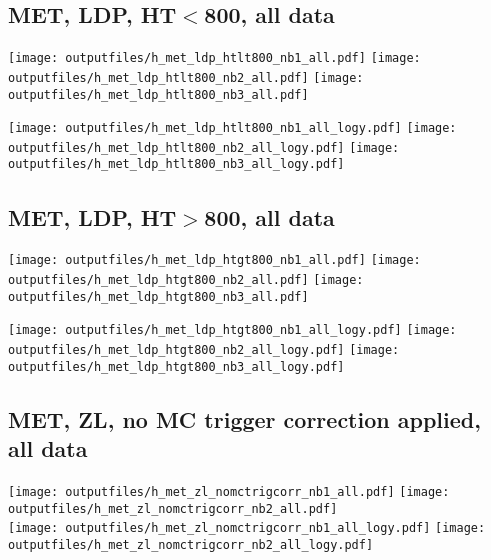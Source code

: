 \documentclass[11pt]{article}
\begin{document}
    \subsection{ MET, LDP, HT$<$800, all data}

    \noindent
     \texttt{[image: outputfiles/h\_met\_ldp\_htlt800\_nb1\_all.pdf]}
     \texttt{[image: outputfiles/h\_met\_ldp\_htlt800\_nb2\_all.pdf]}
     \texttt{[image: outputfiles/h\_met\_ldp\_htlt800\_nb3\_all.pdf]}

    \noindent
     \texttt{[image: outputfiles/h\_met\_ldp\_htlt800\_nb1\_all\_logy.pdf]}
     \texttt{[image: outputfiles/h\_met\_ldp\_htlt800\_nb2\_all\_logy.pdf]}
     \texttt{[image: outputfiles/h\_met\_ldp\_htlt800\_nb3\_all\_logy.pdf]}


    \subsection{ MET, LDP, HT$>$800, all data}

    \noindent
     \texttt{[image: outputfiles/h\_met\_ldp\_htgt800\_nb1\_all.pdf]}
     \texttt{[image: outputfiles/h\_met\_ldp\_htgt800\_nb2\_all.pdf]}
     \texttt{[image: outputfiles/h\_met\_ldp\_htgt800\_nb3\_all.pdf]}

    \noindent
     \texttt{[image: outputfiles/h\_met\_ldp\_htgt800\_nb1\_all\_logy.pdf]}
     \texttt{[image: outputfiles/h\_met\_ldp\_htgt800\_nb2\_all\_logy.pdf]}
     \texttt{[image: outputfiles/h\_met\_ldp\_htgt800\_nb3\_all\_logy.pdf]}



     \subsection{ MET, ZL, no MC trigger correction applied, all data}

    \noindent
     \texttt{[image: outputfiles/h\_met\_zl\_nomctrigcorr\_nb1\_all.pdf]}
     \texttt{[image: outputfiles/h\_met\_zl\_nomctrigcorr\_nb2\_all.pdf]} \\

    \noindent
     \texttt{[image: outputfiles/h\_met\_zl\_nomctrigcorr\_nb1\_all\_logy.pdf]}
     \texttt{[image: outputfiles/h\_met\_zl\_nomctrigcorr\_nb2\_all\_logy.pdf]}
\end{document}
